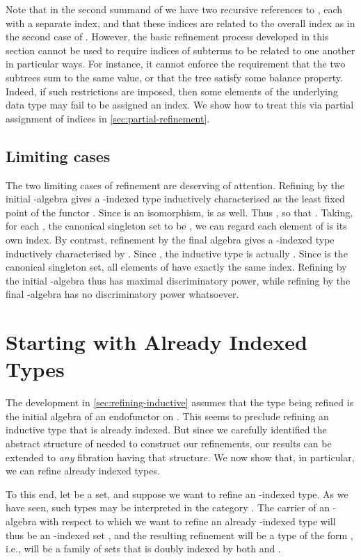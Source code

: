 \documentclass{LMCS}
\begin{document}
\noindent
Note that in the second summand of
 we have two recursive references
to , each with a separate index, and that these indices are related
to the overall index  as in the second case of
. However, the basic refinement process developed in
this section cannot be used to require indices of subterms to be
related to one another in particular ways. For instance, it cannot
enforce the requirement that the two subtrees sum to the same value,
or that the tree satisfy some balance property. Indeed, if such
restrictions are imposed, then some elements of the underlying data
type may fail to be assigned an index. We show how to treat this via
partial assignment of indices in \autoref{sec:partial-refinement}.

\subsection{Limiting cases} 

The two limiting cases of refinement are deserving of attention.
Refining by the initial -algebra 
gives a -indexed type inductively characterised as the least
fixed point of the functor . Since  is an isomorphism,  is as
well. Thus , so that . Taking, for each , the canonical
singleton set  to be , we can regard each element of 
is its own index. By contrast, refinement by the final algebra  gives a -indexed type inductively characterised by
. Since , the inductive type  is actually
. Since  is the canonical singleton set, all elements of
 have exactly the same index.  Refining by the initial
-algebra thus has maximal discriminatory power, while refining by
the final -algebra has no discriminatory power whatsoever.

\section{Starting with Already Indexed
  Types}\label{sec:indexed-refinement}  

The development in \autoref{sec:refining-inductive} assumes that the
type being refined is the initial algebra of an endofunctor  on
. This seems to preclude refining an inductive type that is
already indexed. But since we carefully identified the abstract
structure of  needed to construct our refinements, our
results can be extended to {\em any} fibration having that
structure. We now show that, in particular, we can refine already
indexed types.

To this end, let  be a set, and suppose we want to refine an
-indexed type.  As we have seen, such types may be interpreted in
the category . The carrier of an -algebra 
with respect to which we want to refine an already -indexed type
will thus be an -indexed set , and the resulting
refinement will be a type of the form , i.e.,
will be a family of sets that is doubly indexed by both  and .
\end{document}
